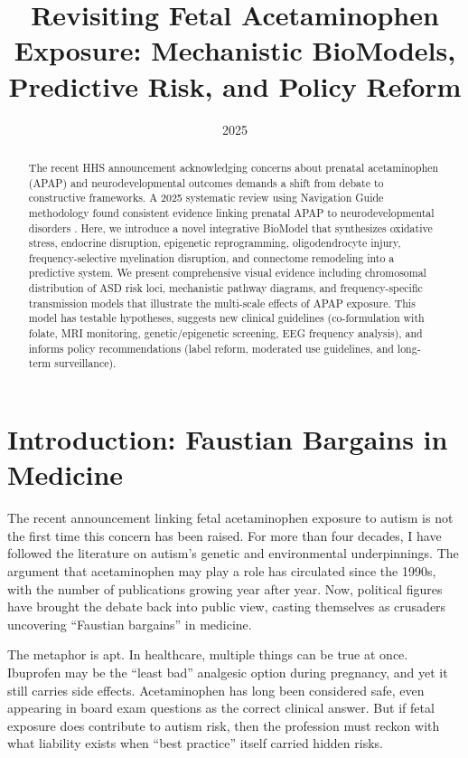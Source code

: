 \documentclass[12pt]{article}
\title{Revisiting Fetal Acetaminophen Exposure: Mechanistic BioModels, Predictive Risk, and Policy Reform}
\author{}
\date{2025}
\begin{document}
\maketitle 

\begin{abstract}
The recent HHS announcement acknowledging concerns about prenatal acetaminophen (APAP) and neurodevelopmental outcomes demands a shift from debate to constructive frameworks. A 2025 systematic review using Navigation Guide methodology found consistent evidence linking prenatal APAP to neurodevelopmental disorders \citep{navarro2025}. Here, we introduce a novel integrative BioModel that synthesizes oxidative stress, endocrine disruption, epigenetic reprogramming, oligodendrocyte injury, frequency-selective myelination disruption, and connectome remodeling into a predictive system. We present comprehensive visual evidence including chromosomal distribution of ASD risk loci, mechanistic pathway diagrams, and frequency-specific transmission models that illustrate the multi-scale effects of APAP exposure. This model has testable hypotheses, suggests new clinical guidelines (co-formulation with folate, MRI monitoring, genetic/epigenetic screening, EEG frequency analysis), and informs policy recommendations (label reform, moderated use guidelines, and long-term surveillance).
\end{abstract}

\section{Introduction: Faustian Bargains in Medicine}

The recent announcement linking fetal acetaminophen exposure to autism is not the first time this concern has been raised. For more than four decades, I have followed the literature on autism's genetic and environmental underpinnings. The argument that acetaminophen may play a role has circulated since the 1990s, with the number of publications growing year after year. Now, political figures have brought the debate back into public view, casting themselves as crusaders uncovering ``Faustian bargains'' in medicine.

The metaphor is apt. In healthcare, multiple things can be true at once. Ibuprofen may be the ``least bad'' analgesic option during pregnancy, and yet it still carries side effects. Acetaminophen has long been considered safe, even appearing in board exam questions as the correct clinical answer. But if fetal exposure does contribute to autism risk, then the profession must reckon with what liability exists when ``best practice'' itself carried hidden risks.
\end{document}
